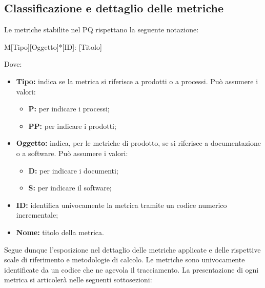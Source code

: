 \documentclass[../NormediProgetto.tex]{subfiles}
\begin{document}
\subsection{Classificazione e dettaglio delle metriche}

Le metriche stabilite nel PQ rispettano la seguente notazione:

    \begin{center}
        M[Tipo][Oggetto]*[ID]: [Titolo]
    \end{center}
    
Dove:

\begin{itemize}
    \item \textbf{Tipo:} indica se la metrica si riferisce a prodotti o a processi. Può assumere i valori:
    
    \begin{itemize}
        \item \textbf{P:} per indicare i processi;
        \item \textbf{PP:} per indicare i prodotti;
    \end{itemize}
    
    \item \textbf{Oggetto:} indica, per le metriche di prodotto, se si riferisce a documentazione o a software. Può assumere i valori:
    
    \begin{itemize}
        \item \textbf{D:} per indicare i documenti;
        \item \textbf{S:} per indicare il software;
    \end{itemize}
    
    \item \textbf{ID:} identifica univocamente la metrica tramite un codice numerico incrementale;
    
    \item \textbf{Nome:} titolo della metrica.
\end{itemize}

Segue dunque l'esposizione nel dettaglio delle metriche applicate e delle rispettive scale di riferimento e metodologie di calcolo. Le metriche sono univocamente identificate da un codice che ne agevola il tracciamento. La presentazione di ogni metrica si articolerà nelle seguenti sottosezioni:
\end{document}
